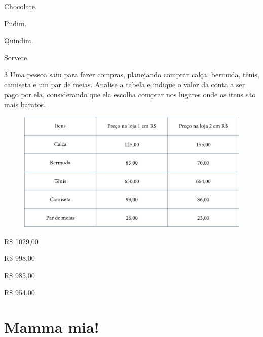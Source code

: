 \begin{escolha}[itemsep=-5pt]
\item Chocolate.

\item Pudim.

\item Quindim.

\item Sorvete
\end{escolha}

\pagebreak
\num{3} Uma pessoa saiu para fazer compras, planejando comprar calça, bermuda, tênis, camiseta e um par de meias. Analise a tabela e indique o valor da conta a ser pago por ela, considerando que ela escolha comprar nos lugares onde os
itens são mais baratos.

\begin{figure}[htpb!]
\includegraphics[width=\textwidth]{./media/image102.png}
\end{figure}

\begin{escolha}[itemsep=-5pt]
\item R\$ 1029,00

\item R\$ 998,00

\item R\$ 985,00

\item R\$ 954,00
\end{escolha}

\chapter{Mamma mia!}

\vspace*{-1.5cm}

